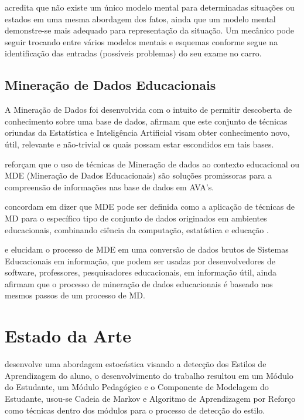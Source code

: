 \documentclass[12pt]{article}
\begin{document}
\cite{Moreira1996} acredita que não existe um único modelo mental para determinadas situações ou estados em uma mesma abordagem dos fatos, ainda que um modelo mental demonstre-se mais adequado para representação da situação. Um mecânico pode seguir trocando entre vários modelos mentais e esquemas conforme segue na identificação das entradas (possíveis problemas) do seu exame no carro.

\subsection{Mineração de Dados Educacionais}

A Mineração de Dados foi desenvolvida com o intuito de permitir descoberta de conhecimento sobre uma base de dados, \cite{Goldschmidt_Passos_2005} afirmam que este conjunto de técnicas oriundas da Estatística e Inteligência Artificial visam obter conhecimento novo, útil, relevante e não-trivial os quais possam estar escondidos em tais bases.

\cite{Leite_et_al_2016} reforçam que o uso de técnicas de Mineração de dados ao contexto educacional ou MDE (Mineração de Dados Educacionais) são soluções promissoras para a compreensão de informações nas base de dados em AVA's.

\cite{Romero_Ventura_2013} concordam em dizer que MDE pode ser definida como a aplicação de técnicas de MD para o específico tipo de conjunto de dados originados em ambientes educacionais, combinando ciência da computação, estatística e educação .

\cite{Garcia_et_al_2011} e \cite{Santos2016} elucidam o processo de MDE em uma conversão de dados brutos de Sistemas Educacionais em informação, que podem ser usadas por desenvolvedores de software, professores, pesquisadores educacionais, em informação útil, \cite{Garcia_et_al_2011} ainda afirmam que o processo de mineração de dados educacionais é baseado nos mesmos passos de um processo de MD.

\section{Estado da Arte}

\cite{Dorca2012} desenvolve uma abordagem estocástica visando a detecção dos Estilos de Aprendizagem do aluno, o desenvolvimento do trabalho resultou em um Módulo do Estudante, um Módulo Pedagógico e o Componente de Modelagem do Estudante, usou-se Cadeia de Markov e Algoritmo de Aprendizagem por Reforço como técnicas dentro dos módulos para o processo de detecção do estilo.
\end{document}
